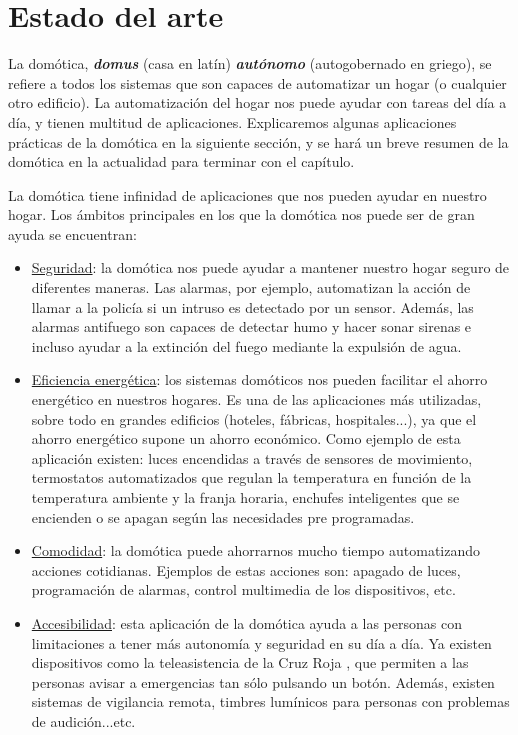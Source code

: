 \chapter{Estado del arte}
\label{chap:estadodelarte}

La domótica, \textbf{\textit{domus}} (casa en latín) \textbf{\textit{autónomo}} (autogobernado en griego), se refiere a todos los sistemas
que son capaces de automatizar un hogar (o cualquier otro edificio). La automatización del hogar nos puede ayudar con tareas del día a día,
y tienen multitud de aplicaciones. Explicaremos algunas aplicaciones prácticas de la domótica en la siguiente sección, y se hará un breve
resumen de la domótica en la actualidad para terminar con el capítulo.


La domótica tiene infinidad de aplicaciones que nos pueden ayudar en nuestro hogar. Los ámbitos principales en los que la domótica nos puede
ser de gran ayuda se encuentran:

\begin{itemize}
\item\underline{Seguridad}: la domótica nos puede ayudar a mantener nuestro hogar seguro de diferentes maneras. Las alarmas, por ejemplo, automatizan 
la acción de llamar a la policía si un intruso es detectado por un sensor. Además, las alarmas antifuego son capaces de detectar humo y hacer sonar 
sirenas e incluso ayudar a la extinción del fuego mediante la expulsión de agua.
\item\underline{Eficiencia energética}: los sistemas domóticos nos pueden facilitar el ahorro energético en nuestros hogares. Es una de las aplicaciones
más utilizadas, sobre todo en grandes edificios (hoteles, fábricas, hospitales...), ya que el ahorro energético supone un ahorro económico. Como ejemplo
de esta aplicación existen: luces encendidas a través de sensores de movimiento, termostatos automatizados que regulan la temperatura en función de la
temperatura ambiente y la franja horaria, enchufes inteligentes que se encienden o se apagan según las necesidades pre programadas.
\item\underline{Comodidad}: la domótica puede ahorrarnos mucho tiempo automatizando acciones cotidianas. Ejemplos de estas acciones son: apagado de luces,
programación de alarmas, control multimedia de los dispositivos, etc.
\item\underline{Accesibilidad}: esta aplicación de la domótica ayuda a las personas con limitaciones a tener más autonomía y seguridad en su día a día. Ya
existen dispositivos como la teleasistencia de la Cruz Roja \cite{CruzRoja:teleasistencia}, que permiten a las personas avisar a emergencias tan sólo pulsando un botón.
Además, existen sistemas de vigilancia remota, timbres lumínicos para personas con problemas de audición...etc.
\end{itemize}

